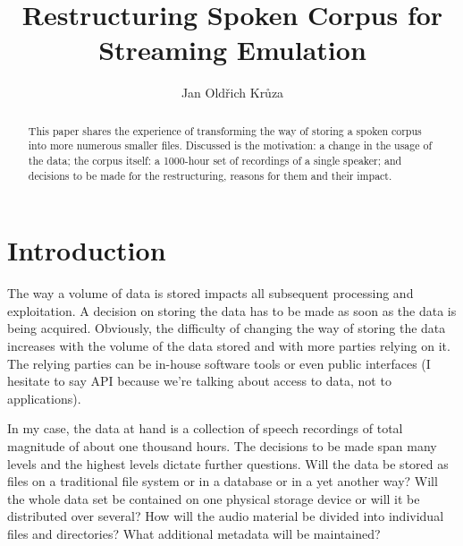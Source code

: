 \documentclass[runningheads]{llncs}
\begin{document}
%
\title{Restructuring Spoken Corpus for Streaming Emulation}
%
%
\author{Jan Oldřich Krůza}
%
%
%
\maketitle              %
%

\begin{abstract}
This paper shares the experience of transforming the way of storing a spoken
corpus into more numerous smaller files. Discussed is the motivation: a change
in the usage of the data; the corpus itself: a 1000-hour set of recordings of a
single speaker; and decisions to be made for the restructuring, reasons for them
and their impact.
\end{abstract}

\section{Introduction}

The way a volume of data is stored impacts all subsequent processing and
exploitation\cite{reppen2010building}. A decision on storing the data has to be made as soon as the
data is being acquired. Obviously, the difficulty of changing the way of storing
the data increases with the volume of the data stored and with more parties relying
on it. The relying parties can be in-house software tools or even public
interfaces (I hesitate to say API because we're talking about access to data,
not to applications).

In my case, the data at hand is a collection of speech recordings of total
magnitude of about one thousand hours. The decisions to be made span many levels
and the highest levels dictate further questions. Will the data be stored as
files on a traditional file system or in a database or in a yet another way?
Will the whole data set be contained on one physical storage device or will it
be distributed over several? How will the audio material be divided into
individual files and directories? What additional metadata will be
maintained?\cite{crowdy1993spoken}
\end{document}
